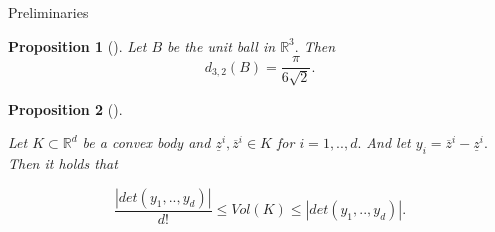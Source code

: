 \documentclass[12pt]{article}
\newtheorem{proposition}{Proposition}[section]
\begin{document}
\begin{section}{Preliminaries}
    \begin{proposition}[\cite{makai1978}]
        \label{d32-ball}
        Let $B$ be the unit ball in $\mathbb{R}^{3}.$ Then 
        $$
            d_{3,2}(B) = \frac{\pi}{6\sqrt{2}}.
        $$
    \end{proposition}

    \begin{proposition}[\cite{approx}] 
    \label{app}
    
    Let $K\subset \mathbb{R}^{d}$ be a convex body and $\underline{z}^{i},\overline{z}^{i}\in K$ for $i =1,..,d.$ And let $y_{i} = \overline{z}^{i}-\underline{z}^{i}.$ Then it holds that

    $$
        \frac{|det(y_{1},..,y_{d})|}{d!}\leq Vol(K)\leq |det(y_{1},..,y_{d})|.
    $$
        
    \end{proposition}

    
\end{section}
    
\end{document}
